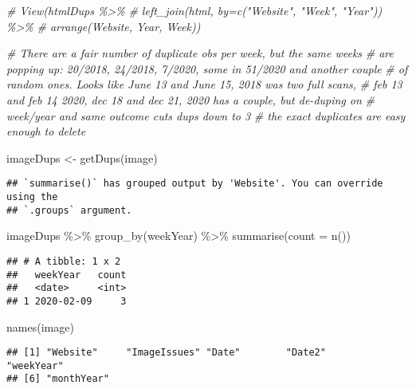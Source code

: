 \documentclass[
]{article}
\newenvironment{Shaded}{\begin{snugshade}}{\end{snugshade}}
\newcommand{\AttributeTok}[1]{\textcolor[rgb]{0.77,0.63,0.00}{#1}}
\newcommand{\CommentTok}[1]{\textcolor[rgb]{0.56,0.35,0.01}{\textit{#1}}}
\newcommand{\FunctionTok}[1]{\textcolor[rgb]{0.00,0.00,0.00}{#1}}
\newcommand{\NormalTok}[1]{#1}
\newcommand{\OtherTok}[1]{\textcolor[rgb]{0.56,0.35,0.01}{#1}}
\newcommand{\SpecialCharTok}[1]{\textcolor[rgb]{0.00,0.00,0.00}{#1}}
\begin{document}
\begin{Shaded}
\begin{Highlighting}[]
\CommentTok{\# View(htmlDups \%\textgreater{}\%}
\CommentTok{\#   left\_join(html, by=c("Website", "Week", "Year")) \%\textgreater{}\%}
\CommentTok{\#   arrange(Website, Year, Week))}


\CommentTok{\# There are a fair number of duplicate obs per week, but the same weeks}
\CommentTok{\# are popping up: 20/2018, 24/2018, 7/2020, some in 51/2020 and another couple}
\CommentTok{\# of random ones. Looks like June 13 and June 15, 2018 was two full scans, }
\CommentTok{\# feb 13 and feb 14 2020, dec 18 and dec 21, 2020 has a couple, but de{-}duping on }
\CommentTok{\# week/year and same outcome cuts dups down to 3}
\CommentTok{\# the exact duplicates are easy enough to delete}


\NormalTok{imageDups }\OtherTok{\textless{}{-}} \FunctionTok{getDups}\NormalTok{(image)}
\end{Highlighting}
\end{Shaded}

\begin{verbatim}
## `summarise()` has grouped output by 'Website'. You can override using the
## `.groups` argument.
\end{verbatim}

\begin{Shaded}
\begin{Highlighting}[]
\NormalTok{imageDups }\SpecialCharTok{\%\textgreater{}\%} \FunctionTok{group\_by}\NormalTok{(weekYear) }\SpecialCharTok{\%\textgreater{}\%} \FunctionTok{summarise}\NormalTok{(}\AttributeTok{count =} \FunctionTok{n}\NormalTok{())}
\end{Highlighting}
\end{Shaded}

\begin{verbatim}
## # A tibble: 1 x 2
##   weekYear   count
##   <date>     <int>
## 1 2020-02-09     3
\end{verbatim}

\begin{Shaded}
\begin{Highlighting}[]
\FunctionTok{names}\NormalTok{(image)}
\end{Highlighting}
\end{Shaded}

\begin{verbatim}
## [1] "Website"     "ImageIssues" "Date"        "Date2"       "weekYear"   
## [6] "monthYear"
\end{verbatim}
\end{document}
